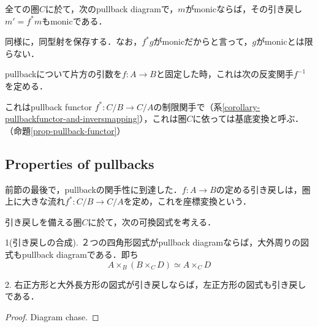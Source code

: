 \documentclass[uplatex, 12pt, dvipdfmx]{jsarticle}
\begin{document}
\begin{proposition*}[引き戻しはmonomorphismを保存する]
    全ての圏$C$に於て，次のpullback diagramで，$m$がmonicならば，その引き戻し$m'=f^*m$もmonicである．
    \begin{center}
    \end{center}
\end{proposition*}
\begin{remark*}
    同様に，同型射を保存する．なお，$f^*g$がmonicだからと言って，$g$がmonicとは限らない．
\end{remark*}
\begin{proposition*}
    pullbackについて片方の引数を$f:A\to B$と固定した時，これは次の反変関手$f^{-1}$を定める．
    \begin{center}
    \end{center}
\end{proposition*}
\begin{remark*}
    これはpullback functor $f^*:C/B\to C/A$の制限関手で（系\ref{corollary-pullbackfunctor-and-inversmapping}），これは圏$C$に依っては基底変換と呼ぶ．（命題\ref{prop-pullback-functor}）
\end{remark*}

\subsection{Properties of pullbacks}
前節の最後で，pullbackの関手性に到達した．$f:A\to B$の定める引き戻しは，圏上に大きな流れ$f^*:C/B\to C/A$を定め，これを座標変換という．

\begin{lemma}\label{lemma-two-pullbacks}
    引き戻しを備える圏$C$に於て，次の可換図式を考える．
    \begin{center}
    \end{center}

    1(引き戻しの合成). ２つの四角形図式がpullback diagramならば，大外周りの図式もpullback diagramである．即ち
    \[ A\times_B(B\times_CD)\simeq A\times_CD \]

    2. 右正方形と大外長方形の図式が引き戻しならば，左正方形の図式も引き戻しである．
\end{lemma}
\begin{proof}
    Diagram chase.
\end{proof}
\end{document}
